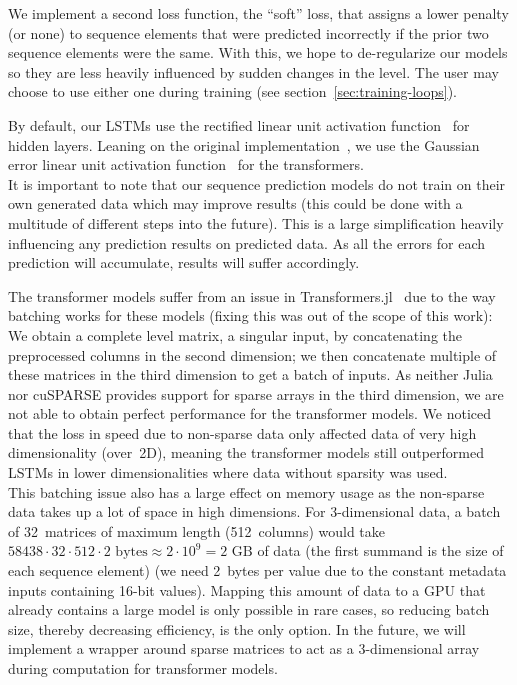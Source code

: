 We implement a second loss function, the ``soft'' loss, that assigns a
lower penalty (or none) to sequence elements that were predicted
incorrectly if the prior two sequence elements were the same. With
this, we hope to de-regularize our models so they are less heavily
influenced by sudden changes in the level. The user may choose to use
either one during training (see section~\ref{sec:training-loops}).

By default, our LSTMs use the rectified linear unit activation
function~\cite{nairRectifiedLinearUnits,RectifierNeuralNetworks2019}
for hidden layers. Leaning on the original
implementation~\cite{OpenaiGpt22019}, we use the Gaussian error linear
unit activation function~\cite{hendrycksGaussianErrorLinear2018} for
the transformers. \\
It is important to note that our sequence prediction models do not
train on their own generated data which may improve results (this
could be done with a multitude of different steps into the future).
This is a large simplification heavily influencing any prediction
results on predicted data. As all the errors for each prediction will
accumulate, results will suffer accordingly.

The transformer models suffer from an issue in
\mbox{Transformers.jl}~\cite{peterChengchingwenTransformersJl2019} due
to the way batching works for these models (fixing this was out of the
scope of this work): We obtain a complete level matrix, a singular
input, by concatenating the preprocessed columns in the second
dimension; we then concatenate multiple of these matrices in the third
dimension to get a batch of inputs. As neither Julia nor cuSPARSE
provides support for sparse arrays in the third dimension, we are not
able to obtain perfect performance for the transformer models. We
noticed that the loss in speed due to non-sparse data only affected
data of very high dimensionality (over~2D), meaning the transformer
models still outperformed LSTMs in lower dimensionalities where data
without sparsity was used. \\
This batching issue also has a large effect on memory usage as the
non-sparse data takes up a lot of space in high dimensions. For
3-dimensional data, a batch of 32~matrices of maximum length
(512~columns) would take
$58438 \cdot 32 \cdot 512 \cdot 2\text{ bytes} \approx 2 \cdot 10^{9} = 2\text{ GB}$ of data
(the first summand is the size of each sequence element) (we need
2~bytes per value due to the constant metadata inputs containing
16-bit values). Mapping this amount of data to a GPU that already
contains a large model is only possible in rare cases, so reducing
batch size, thereby decreasing efficiency, is the only option. In the
future, we will implement a wrapper around sparse matrices to act as a
3-dimensional array during computation for transformer models.

